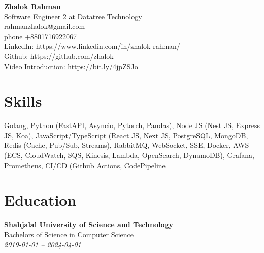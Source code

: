 \documentclass[a4paper,10pt]{article}
\begin{document}
\begin{center}
\Large \textbf{Zhalok Rahman}\\[3pt]
\normalsize Software Engineer 2 at Datatree Technology\\[2pt]
\small rahmanzhalok@gmail.com \\phone +8801716922067\\[2pt]
\small LinkedIn: https://www.linkedin.com/in/zhalok-rahman/\\[2pt]
\small Github: https://github.com/zhalok\\[2pt]
\small Video Introduction: https://bit.ly/4jpZSJo\\[2pt]
\end{center}
\section*{Skills}
Golang, Python (FastAPI, Asyncio, Pytorch, Pandas), Node JS (Nest JS, Express JS, Koa), JavaScript/TypeScript (React JS, Next JS, PostgreSQL, MongoDB, Redis (Cache, Pub/Sub, Streams), RabbitMQ, WebSocket, SSE, Docker, AWS (ECS, CloudWatch, SQS, Kinesis, Lambda, OpenSearch, DynamoDB), Grafana, Prometheus, CI/CD (Github Actions, CodePipeline
\vspace{2pt}
\section*{Education}
\textbf{Shahjalal University of Science and Technology}\\
Bachelors of Science in Computer Science\\
\textit{2019-01-01 -- 2024-04-01}\\
\vspace{2pt}
\end{document}
